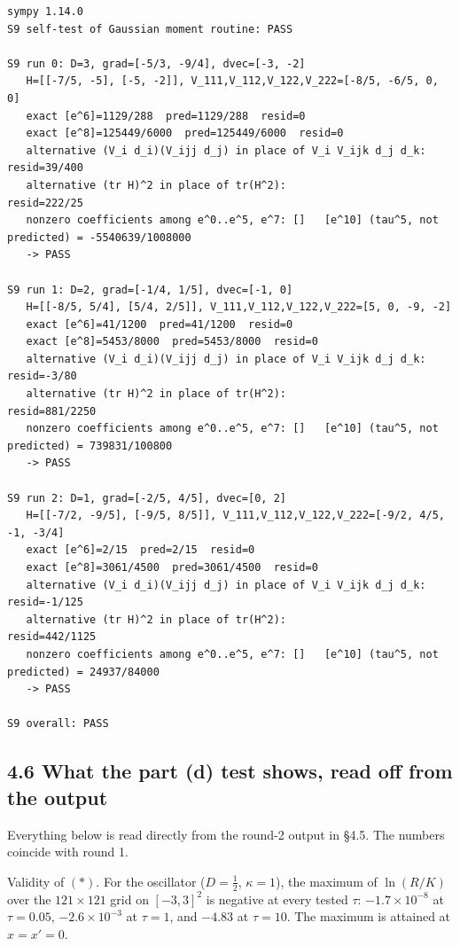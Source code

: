 \documentclass[11pt,a4paper]{article}
\begin{document}
\begin{lstlisting}
sympy 1.14.0
S9 self-test of Gaussian moment routine: PASS

S9 run 0: D=3, grad=[-5/3, -9/4], dvec=[-3, -2]
   H=[[-7/5, -5], [-5, -2]], V_111,V_112,V_122,V_222=[-8/5, -6/5, 0, 0]
   exact [e^6]=1129/288  pred=1129/288  resid=0
   exact [e^8]=125449/6000  pred=125449/6000  resid=0
   alternative (V_i d_i)(V_ijj d_j) in place of V_i V_ijk d_j d_k: resid=39/400
   alternative (tr H)^2 in place of tr(H^2):                      resid=222/25
   nonzero coefficients among e^0..e^5, e^7: []   [e^10] (tau^5, not predicted) = -5540639/1008000
   -> PASS

S9 run 1: D=2, grad=[-1/4, 1/5], dvec=[-1, 0]
   H=[[-8/5, 5/4], [5/4, 2/5]], V_111,V_112,V_122,V_222=[5, 0, -9, -2]
   exact [e^6]=41/1200  pred=41/1200  resid=0
   exact [e^8]=5453/8000  pred=5453/8000  resid=0
   alternative (V_i d_i)(V_ijj d_j) in place of V_i V_ijk d_j d_k: resid=-3/80
   alternative (tr H)^2 in place of tr(H^2):                      resid=881/2250
   nonzero coefficients among e^0..e^5, e^7: []   [e^10] (tau^5, not predicted) = 739831/100800
   -> PASS

S9 run 2: D=1, grad=[-2/5, 4/5], dvec=[0, 2]
   H=[[-7/2, -9/5], [-9/5, 8/5]], V_111,V_112,V_122,V_222=[-9/2, 4/5, -1, -3/4]
   exact [e^6]=2/15  pred=2/15  resid=0
   exact [e^8]=3061/4500  pred=3061/4500  resid=0
   alternative (V_i d_i)(V_ijj d_j) in place of V_i V_ijk d_j d_k: resid=-1/125
   alternative (tr H)^2 in place of tr(H^2):                      resid=442/1125
   nonzero coefficients among e^0..e^5, e^7: []   [e^10] (tau^5, not predicted) = 24937/84000
   -> PASS

S9 overall: PASS
\end{lstlisting}

\hypertarget{what-the-part-d-test-shows-read-off-from-the-output}{%
\subsection{4.6 What the part (d) test shows, read off from the output}\label{what-the-part-d-test-shows-read-off-from-the-output}}

Everything below is read directly from the round-2 output in §4.5. The numbers coincide with round 1.

Validity of \((\ast)\). For the oscillator (\(D=\tfrac12\), \(\kappa=1\)), the maximum of \(\ln(R/K)\) over the \(121\times121\) grid on \([-3,3]^2\) is negative at every tested \(\tau\): \(-1.7\times10^{-8}\) at \(\tau=0.05\), \(-2.6\times10^{-3}\) at \(\tau=1\), and \(-4.83\) at \(\tau=10\). The maximum is attained at \(x=x'=0\).
\end{document}
